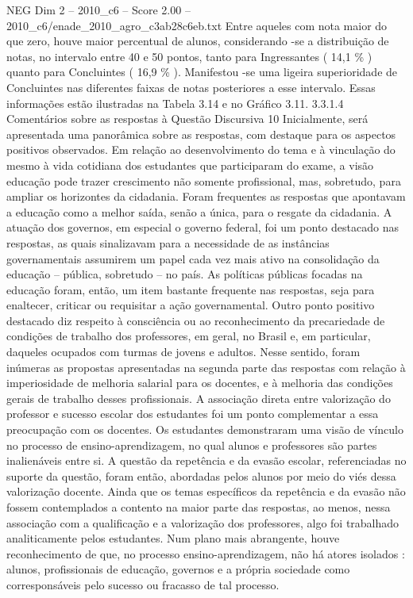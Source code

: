 \begin{textsample}{NEG Dim 2 – 2010\_c6 – Score 2.00 – 2010\_c6/enade\_2010\_agro\_c3ab28c6eb.txt}
Entre aqueles com nota maior do que zero, houve maior percentual de alunos, considerando -se a distribuição de notas, no intervalo entre 40 e 50 pontos, tanto para Ingressantes ( 14,1 \% ) quanto para Concluintes ( 16,9 \% ).
Manifestou -se uma ligeira superioridade de Concluintes nas diferentes faixas de notas posteriores a esse intervalo.
Essas informações estão ilustradas na Tabela 3.14 e no Gráfico 3.11. 3.3.1.4 Comentários sobre as respostas à Questão Discursiva 10 Inicialmente, será apresentada uma panorâmica sobre as respostas, com destaque para os aspectos positivos observados.
Em relação ao desenvolvimento do tema e à vinculação do mesmo à vida cotidiana dos estudantes que participaram do exame, a visão educação pode trazer crescimento não somente profissional, mas, sobretudo, para ampliar os horizontes da cidadania.
Foram frequentes as respostas que apontavam a educação como a melhor saída, senão a única, para o resgate da cidadania.
A atuação dos governos, em especial o governo federal, foi um ponto destacado nas respostas, as quais sinalizavam para a necessidade de as instâncias governamentais assumirem um papel cada vez mais ativo na consolidação da educação – pública, sobretudo – no país.
As políticas públicas focadas na educação foram, então, um item bastante frequente nas respostas, seja para enaltecer, criticar ou requisitar a ação governamental.
Outro ponto positivo destacado diz respeito à consciência ou ao reconhecimento da precariedade de condições de trabalho dos professores, em geral, no Brasil e, em particular, daqueles ocupados com turmas de jovens e adultos.
Nesse sentido, foram inúmeras as propostas apresentadas na segunda parte das respostas com relação à imperiosidade de melhoria salarial para os docentes, e à melhoria das condições gerais de trabalho desses profissionais.
A associação direta entre valorização do professor e sucesso escolar dos estudantes foi um ponto complementar a essa preocupação com os docentes.
Os estudantes demonstraram uma visão de vínculo no processo de ensino-aprendizagem, no qual alunos e professores são partes inalienáveis entre si.
A questão da repetência e da evasão escolar, referenciadas no suporte da questão, foram então, abordadas pelos alunos por meio do viés dessa valorização docente.
Ainda que os temas específicos da repetência e da evasão não fossem contemplados a contento na maior parte das respostas, ao menos, nessa associação com a qualificação e a valorização dos professores, algo foi trabalhado analiticamente pelos estudantes.
Num plano mais abrangente, houve reconhecimento de que, no processo ensino-aprendizagem, não há atores isolados : alunos, profissionais de educação, governos e a própria sociedade como corresponsáveis pelo sucesso ou fracasso de tal processo.

\end{textsample}
